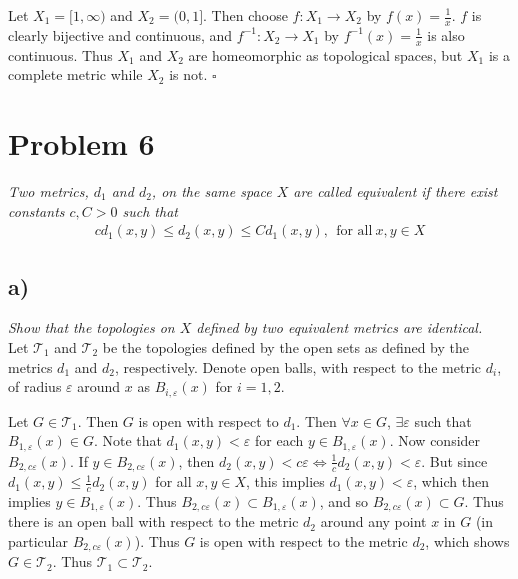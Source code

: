 \documentclass[12pt]{article}
\theoremstyle{plain}
\begin{document}
Let $X_1 = [1,\infty)$ and $X_2 = (0,1]$.  Then choose $f:X_1 \rightarrow X_2$ by $f(x) = \frac{1}{x}$.  $f$ is clearly bijective and continuous, and $f^{-1}:X_2 \rightarrow X_1$ by $f^{-1}(x) = \frac{1}{x}$ is also continuous.  Thus $X_1$ and $X_2$ are homeomorphic as topological spaces, but $X_1$ is a complete metric while $X_2$ is not. \hfill $\square$

\section*{Problem 6}
\emph{Two metrics, $d_1$ and $d_2$, on the same space $X$ are called equivalent if there exist constants $c, C > 0$ such that}
\begin{align*}
    cd_1(x, y) \leq d_2(x, y) \leq Cd_1(x, y),\ \ \text{for all}\ x,y \in X
\end{align*}
\subsection*{ a)}
\emph{Show that the topologies on $X$ defined by two equivalent metrics are identical.} \\

Let $\mathcal{T}_1$ and $\mathcal{T}_2$ be the topologies defined by the open sets as defined by the metrics $d_1$ and $d_2$, respectively.  Denote open balls, with respect to the metric $d_i$, of radius $\varepsilon$ around $x$ as $B_{i,\varepsilon}(x)$ for $i = 1,2$.

Let $G \in \mathcal{T}_1$.  Then $G$ is open with respect to $d_1$.  Then $\forall x \in G$, $\exists \varepsilon$ such that $B_{1,\varepsilon}(x) \in G$.  Note that $d_1(x,y) < \varepsilon$ for each $y \in B_{1,\varepsilon}(x)$.  Now consider $B_{2,c\varepsilon}(x)$.  If $y \in B_{2,c\varepsilon}(x)$, then $d_2(x, y) < c\varepsilon \iff \frac{1}{c}d_2(x, y) < \varepsilon$.  But since $d_1(x,y) \leq \frac{1}{c}d_2(x, y)$ for all $x,y \in X$, this implies $d_1(x, y) < \varepsilon$, which then implies $y \in B_{1, \varepsilon}(x)$.  Thus $B_{2,c\varepsilon}(x) \subset B_{1,\varepsilon}(x)$, and so $B_{2,c\varepsilon}(x) \subset G$.  Thus there is an open ball with respect to the metric $d_2$ around any point $x$ in $G$ (in particular $B_{2,c\varepsilon}(x)$).  Thus $G$ is open with respect to the metric $d_2$, which shows $G \in \mathcal{T}_2$.  Thus $\mathcal{T}_1 \subset \mathcal{T}_2$.
\end{document}
